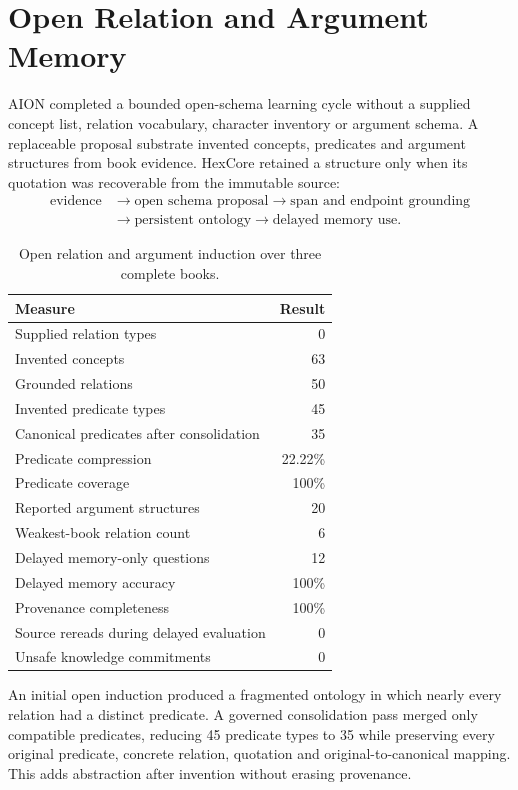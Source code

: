 \section{Open Relation and Argument Memory}
\label{sec:open-relation-argument-memory}

AION completed a bounded open-schema learning cycle without a supplied concept
list, relation vocabulary, character inventory or argument schema.  A
replaceable proposal substrate invented concepts, predicates and argument
structures from book evidence.  HexCore retained a structure only when its
quotation was recoverable from the immutable source:
\[
\begin{aligned}
 \text{evidence}
 &\rightarrow \text{open schema proposal}
 \rightarrow \text{span and endpoint grounding}\\
 &\rightarrow \text{persistent ontology}
 \rightarrow \text{delayed memory use}.
\end{aligned}
\]

\begin{table}[htbp]
\centering
\begin{tabular}{lr}
\hline
Measure & Result \\
\hline
Supplied relation types & 0 \\
Invented concepts & 63 \\
Grounded relations & 50 \\
Invented predicate types & 45 \\
Canonical predicates after consolidation & 35 \\
Predicate compression & 22.22\% \\
Predicate coverage & 100\% \\
Reported argument structures & 20 \\
Weakest-book relation count & 6 \\
Delayed memory-only questions & 12 \\
Delayed memory accuracy & 100\% \\
Provenance completeness & 100\% \\
Source rereads during delayed evaluation & 0 \\
Unsafe knowledge commitments & 0 \\
\hline
\end{tabular}
\caption{Open relation and argument induction over three complete books.}
\end{table}

An initial open induction produced a fragmented ontology in which nearly every
relation had a distinct predicate.  A governed consolidation pass merged only
compatible predicates, reducing 45 predicate types to 35 while preserving
every original predicate, concrete relation, quotation and original-to-canonical
mapping.  This adds abstraction after invention without erasing provenance.

